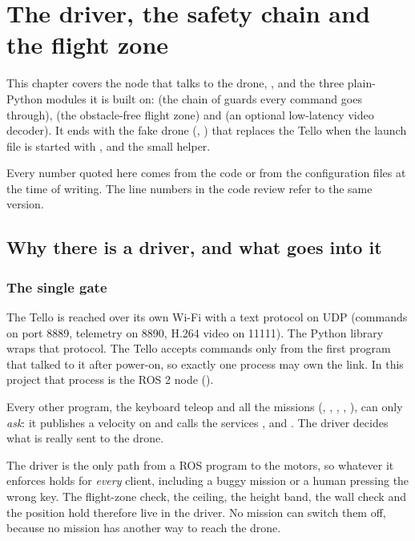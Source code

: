 \chapter{The driver, the safety chain and the flight zone}
\label{ch:driver}
\setlength{\emergencystretch}{3em}

This chapter covers the node that talks to the drone, , and the three plain-Python modules it
is built on:  (the chain of guards every command goes through),  (the obstacle-free
flight zone) and  (an optional low-latency video decoder). It ends with the fake drone
(, ) that replaces the Tello when the launch file is started with
, and the small  helper.

Every number quoted here comes from the code or from the configuration files at the time of writing. The line
numbers in the code review refer to the same version.

\section{Why there is a driver, and what goes into it}
\label{sec:driver-role}

\subsection{The single gate}

The Tello is reached over its own Wi-Fi with a text protocol on UDP (commands on port 8889, telemetry on 8890,
H.264 video on 11111). The Python library  wraps that protocol. The Tello accepts commands only from
the first program that talked to it after power-on, so exactly one process may own the link. In this project
that process is the ROS 2 node  ().

Every other program, the keyboard teleop and all the missions (, ,
, , ), can only \emph{ask}: it publishes a velocity on
 and calls the services ,  and
. The driver decides what is really sent to the drone.

\begin{keypoint}
The driver is the only path from a ROS program to the motors, so whatever it enforces holds for \emph{every}
client, including a buggy mission or a human pressing the wrong key. The flight-zone check, the ceiling, the
height band, the wall check and the position hold therefore live in the driver. No mission can switch them off,
because no mission has another way to reach the drone.
\end{keypoint}

